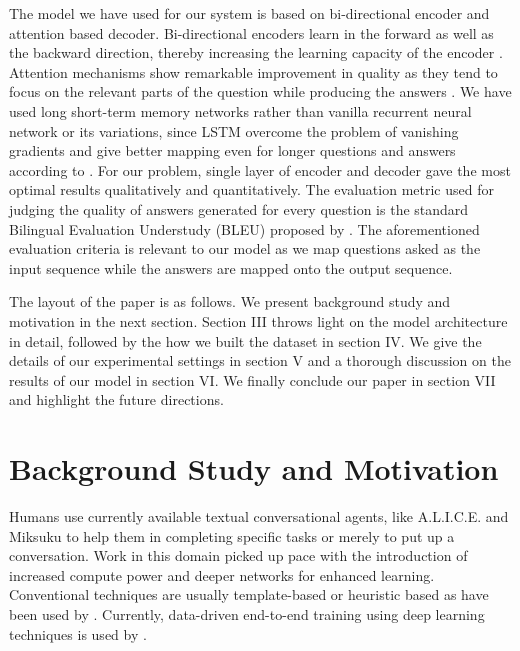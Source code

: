 \documentclass[conference]{IEEEtran}
\begin{document}
The model we have used for our system is based on bi-directional encoder and attention based decoder. Bi-directional encoders learn in the forward as well as the backward direction, thereby increasing the learning capacity of the encoder \cite{BahdanauCB14}. Attention mechanisms show remarkable improvement in quality as they tend to focus on the relevant parts of the question while producing the answers \cite{BahdanauCB14}. We have used long short-term memory networks rather than vanilla recurrent neural network or its variations, since LSTM overcome the problem of vanishing gradients and give better mapping even for longer questions and answers according to \cite{hochreiter1997long}. For our problem, single layer of encoder and decoder gave the most optimal results qualitatively and quantitatively. The evaluation metric used for judging the quality of answers generated for every question is the standard Bilingual Evaluation Understudy (BLEU) proposed by \cite{papineni2002bleu}. The aforementioned evaluation criteria is relevant to our model as we map questions asked as the input sequence while the answers are mapped onto the output sequence.   
   
The layout of the paper is as follows. We present background study and motivation in the next section. Section III throws light on the model architecture in detail, followed by the how we built the dataset in section IV. We give the details of our experimental settings in section V and a thorough discussion on the results of our model in section VI. We finally conclude our paper in section VII and highlight the future directions. 	

\section{Background Study and Motivation}

Humans use currently available textual conversational agents, like A.L.I.C.E. and Miksuku to help them in completing specific tasks or merely to put up a conversation. Work in this domain picked up pace with the introduction of increased compute power and deeper networks for enhanced learning. Conventional techniques are usually template-based or heuristic based as have been used by \cite{Nio2014,Ameixa2014}. Currently, data-driven end-to-end training using deep learning techniques is used by 
\cite{Serban2016building, Shang2015, Sordoni2015, Gao2018neural}. 
\end{document}
